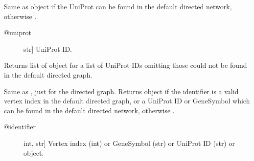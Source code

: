 \documentclass[letterpaper,10pt,english]{sphinxmanual}
\begin{document}
\begin{fulllineitems}
\begin{fulllineitems}
\end{fulllineitems}


\begin{fulllineitems}
\label{\detokenize{main:pypath.main.PyPath.dup}}
Same as  object if the UniProt
can be found in the default directed network,
otherwise .
\begin{description}
\item[{@uniprot}] \leavevmode{[}str{]}
UniProt ID.

\end{description}

\end{fulllineitems}


\begin{fulllineitems}
\label{\detokenize{main:pypath.main.PyPath.dups}}
Returns list of  object
for a list of UniProt IDs omitting those
could not be found in the default
directed graph.

\end{fulllineitems}


\begin{fulllineitems}
\label{\detokenize{main:pypath.main.PyPath.dv}}
Same as , just for the directed graph.
Returns  object if the identifier
is a valid vertex index in the default directed graph,
or a UniProt ID or GeneSymbol which can be found in the
default directed network, otherwise .
\begin{description}
\item[{@identifier}] \leavevmode{[}int, str{]}
Vertex index (int) or GeneSymbol (str) or UniProt ID (str) or
 object.

\end{description}


\end{fulllineitems}
\end{fulllineitems}
\end{document}
